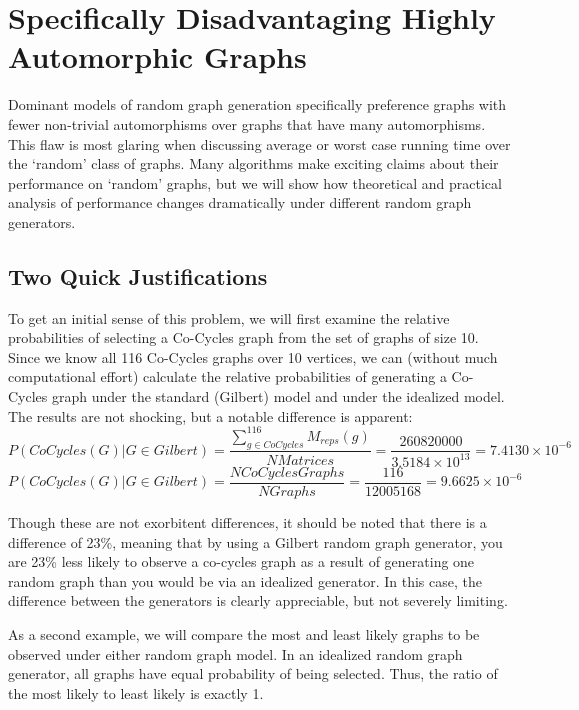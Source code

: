 
\section{Specifically Disadvantaging Highly Automorphic Graphs}

Dominant models of random graph generation specifically preference graphs with fewer non-trivial automorphisms over graphs that have many automorphisms. 
This flaw is most glaring when discussing average or worst case running time over the `random' class of graphs.
Many algorithms make exciting claims about their performance on `random' graphs, but
we will show how theoretical and practical analysis of performance changes dramatically under different random graph generators.

\subsection{Two Quick Justifications}

To get an initial sense of this problem, we will first examine the relative probabilities of selecting a Co-Cycles graph from the set of graphs of size 10.
Since we know all 116 Co-Cycles graphs over 10 vertices, we can (without much computational effort) calculate the relative probabilities of generating a Co-Cycles graph under the standard (Gilbert) model and under the idealized model.
The results are not shocking, but a notable difference is apparent:
$$P(CoCycles(G) | G \in Gilbert) = \frac{\sum_{g \in CoCycles}^{116}M_{reps}(g)}{N Matrices} = \frac{260820000}{3.5184 \times 10^{13}} = 7.4130 \times 10^{-6}$$
$$P(CoCycles(G) | G \in Gilbert) = \frac{N CoCycles Graphs}{N Graphs} = \frac{116}{12005168} = 9.6625 \times 10^{-6}$$

Though these are not exorbitent differences, it should be noted that there is a difference of 23\%, meaning that by using a Gilbert random graph generator, you are 23\% less likely to observe a co-cycles graph as a result of generating one random graph than you would be via an idealized generator.
In this case, the difference between the generators is clearly appreciable, but not severely limiting.

As a second example, we will compare the most and least likely graphs to be observed under either random graph model.
In an idealized random graph generator, all graphs have equal probability of being selected.
Thus, the ratio of the most likely to least likely is exactly 1.

